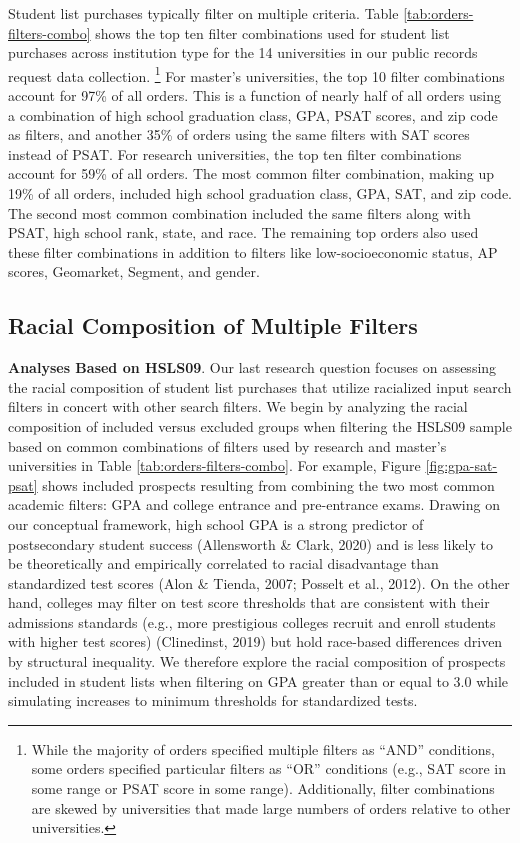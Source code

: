 \documentclass[
  12pt,
]{article}
\begin{document}
Student list purchases typically filter on multiple criteria. Table \ref{tab:orders-filters-combo} shows the top ten filter combinations used for student list purchases across institution type for the 14 universities in our public records request data collection. \footnote{While the majority of orders specified multiple filters as ``AND'' conditions, some orders specified particular filters as ``OR'' conditions (e.g., SAT score in some range or PSAT score in some range). Additionally, filter combinations are skewed by universities that made large numbers of orders relative to other universities.} For master's universities, the top 10 filter combinations account for 97\% of all orders. This is a function of nearly half of all orders using a combination of high school graduation class, GPA, PSAT scores, and zip code as filters, and another 35\% of orders using the same filters with SAT scores instead of PSAT. For research universities, the top ten filter combinations account for 59\% of all orders. The most common filter combination, making up 19\% of all orders, included high school graduation class, GPA, SAT, and zip code. The second most common combination included the same filters along with PSAT, high school rank, state, and race. The remaining top orders also used these filter combinations in addition to filters like low-socioeconomic status, AP scores, Geomarket, Segment, and gender.

\hypertarget{racial-composition-of-multiple-filters}{%
\subsection{Racial Composition of Multiple Filters}\label{racial-composition-of-multiple-filters}}

\textbf{Analyses Based on HSLS09}. Our last research question focuses on assessing the racial composition of student list purchases that utilize racialized input search filters in concert with other search filters. We begin by analyzing the racial composition of included versus excluded groups when filtering the HSLS09 sample based on common combinations of filters used by research and master's universities in Table \ref{tab:orders-filters-combo}. For example, Figure \ref{fig:gpa-sat-psat} shows included prospects resulting from combining the two most common academic filters: GPA and college entrance and pre-entrance exams. Drawing on our conceptual framework, high school GPA is a strong predictor of postsecondary student success (Allensworth \& Clark, 2020) and is less likely to be theoretically and empirically correlated to racial disadvantage than standardized test scores (Alon \& Tienda, 2007; Posselt et al., 2012). On the other hand, colleges may filter on test score thresholds that are consistent with their admissions standards (e.g., more prestigious colleges recruit and enroll students with higher test scores) (Clinedinst, 2019) but hold race-based differences driven by structural inequality. We therefore explore the racial composition of prospects included in student lists when filtering on GPA greater than or equal to 3.0 while simulating increases to minimum thresholds for standardized tests.
\end{document}
